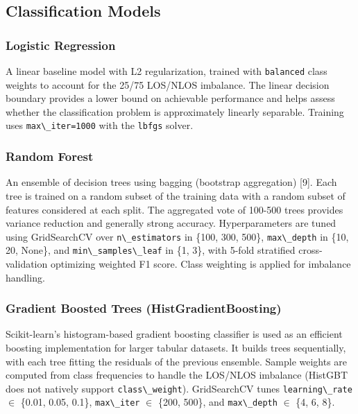 \documentclass[12pt,a4paper]{article}
\newcommand{\passthrough}[1]{#1}
\providecommand{\passthrough}[1]{#1}
\begin{document}
\subsection{Classification Models}\label{classification-models}

\subsubsection{Logistic Regression}\label{logistic-regression}

A linear baseline model with L2 regularization, trained with
\passthrough{\lstinline!balanced!} class weights to account for the
25/75 LOS/NLOS imbalance. The linear decision boundary provides a lower
bound on achievable performance and helps assess whether the
classification problem is approximately linearly separable. Training
uses \passthrough{\lstinline!max\_iter=1000!} with the
\passthrough{\lstinline!lbfgs!} solver.

\subsubsection{Random Forest}\label{random-forest}

An ensemble of decision trees using bagging (bootstrap aggregation)
{[}9{]}. Each tree is trained on a random subset of the training data
with a random subset of features considered at each split. The
aggregated vote of 100-500 trees provides variance reduction and
generally strong accuracy. Hyperparameters are tuned using GridSearchCV
over \passthrough{\lstinline!n\_estimators!} in \{100, 300, 500\},
\passthrough{\lstinline!max\_depth!} in \{10, 20, None\}, and
\passthrough{\lstinline!min\_samples\_leaf!} in \{1, 3\}, with 5-fold
stratified cross-validation optimizing weighted F1 score. Class
weighting is applied for imbalance handling.

\subsubsection{Gradient Boosted Trees
(HistGradientBoosting)}\label{gradient-boosted-trees-histgradientboosting}

Scikit-learn's histogram-based gradient boosting classifier is used as
an efficient boosting implementation for larger tabular datasets. It
builds trees sequentially, with each tree fitting the residuals of the
previous ensemble. Sample weights are computed from class frequencies to
handle the LOS/NLOS imbalance (HistGBT does not natively support
\passthrough{\lstinline!class\_weight!}). GridSearchCV tunes
\passthrough{\lstinline!learning\_rate!} \(\in\) \{0.01, 0.05, 0.1\},
\passthrough{\lstinline!max\_iter!} \(\in\) \{200, 500\}, and
\passthrough{\lstinline!max\_depth!} \(\in\) \{4, 6, 8\}.
\end{document}
